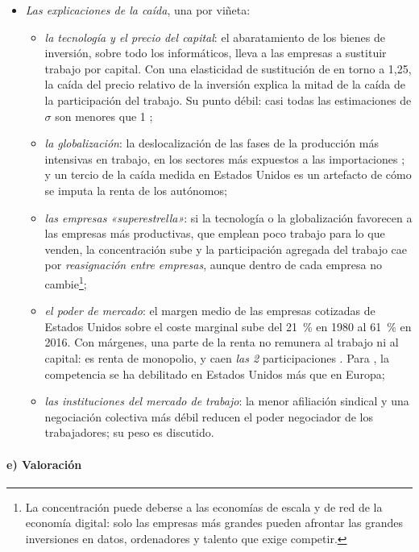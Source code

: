 \documentclass[11pt]{article}
\begin{document}
\begin{itemize}
\item \emph{Las explicaciones de la caída}, una por viñeta:
  \begin{itemize}
  \item \emph{la tecnología y el precio del capital}: el abaratamiento de los bienes de inversión, sobre todo los informáticos, lleva a las empresas a sustituir trabajo por capital. Con una elasticidad de sustitución de en torno a 1,25, la caída del precio relativo de la inversión explica la mitad de la caída de la participación del trabajo\nocite{KarabarbounisNeiman2014}. Su punto débil: casi todas las estimaciones de $\sigma$ son menores que 1 ;
  \item \emph{la globalización}: la deslocalización de las fases de la producción más intensivas en trabajo, en los sectores más expuestos a las importaciones ; y un tercio de la caída medida en Estados Unidos es un artefacto de cómo se imputa la renta de los autónomos\nocite{ElsbyHobijnSahin2013};
  \item \emph{las empresas «superestrella»}: si la tecnología o la globalización favorecen a las empresas más productivas, que emplean poco trabajo para lo que venden, la concentración sube y la participación agregada del trabajo cae por \emph{reasignación entre empresas}, aunque dentro de cada empresa no cambie\nocite{AutorEtAl2020Superstar}\footnote{La concentración puede deberse a las economías de escala y de red de la economía digital: solo las empresas más grandes pueden afrontar las grandes inversiones en datos, ordenadores y talento que exige competir.};
  \item \emph{el poder de mercado}: el margen medio de las empresas cotizadas de Estados Unidos sobre el coste marginal sube del 21~\% en 1980 al 61~\% en 2016\nocite{DeLoeckerEeckhoutUnger2020}. Con márgenes, una parte de la renta no remunera al trabajo ni al capital: es renta de monopolio, y caen \emph{las 2} participaciones\nocite{Barkai2020} . Para \textcite{Philippon2019}, la competencia se ha debilitado en Estados Unidos más que en Europa;
  \item \emph{las instituciones del mercado de trabajo}: la menor afiliación sindical y una negociación colectiva más débil reducen el poder negociador de los trabajadores; su peso es discutido.
  \end{itemize}
\end{itemize}

\paragraph{e) Valoración}
\end{document}
